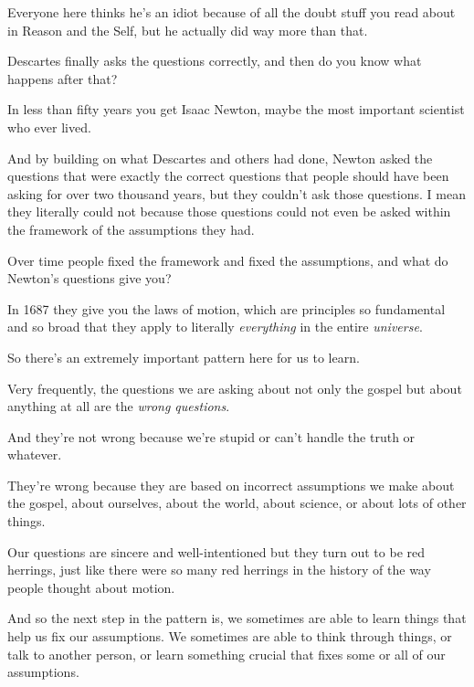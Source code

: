 \begin{compactitem}
\begin{compactitem}
\begin{compactitem}
							\item Everyone here thinks he's an idiot because of all the doubt stuff you read about in Reason and the Self, but he actually did way more than that.
							\item Descartes finally asks the questions correctly, and then do you know what happens after that?
							\item In less than fifty years you get Isaac Newton, maybe the most important scientist who ever lived.
							\item And by building on what Descartes and others had done, Newton asked the questions that were exactly the correct questions that people should have been asking for over two thousand years, but they couldn't ask those questions. I mean they literally could not because those questions could not even be asked within the framework of the assumptions they had.
							\item Over time people fixed the framework and fixed the assumptions, and what do Newton's questions give you?
							\item In 1687 they give you the laws of motion, which are principles so fundamental and so broad that they apply to literally \textit{everything} in the entire \textit{universe}.
						\end{compactitem}
					\item So there's an extremely important pattern here for us to learn.
						\begin{compactitem}
							\item Very frequently, the questions we are asking about not only the gospel but about anything at all are the \textit{wrong questions}.
							\item And they're not wrong because we're stupid or can't handle the truth or whatever.
							\item They're wrong because they are based on incorrect assumptions we make about the gospel, about ourselves, about the world, about science, or about lots of other things.
							\item Our questions are sincere and well-intentioned but they turn out to be red herrings, just like there were so many red herrings in the history of the way people thought about motion.
							\item And so the next step in the pattern is, we sometimes are able to learn things that help us fix our assumptions. We sometimes are able to think through things, or talk to another person, or learn something crucial that fixes some or all of our assumptions.

\end{compactitem}
\end{compactitem}
\end{compactitem}
